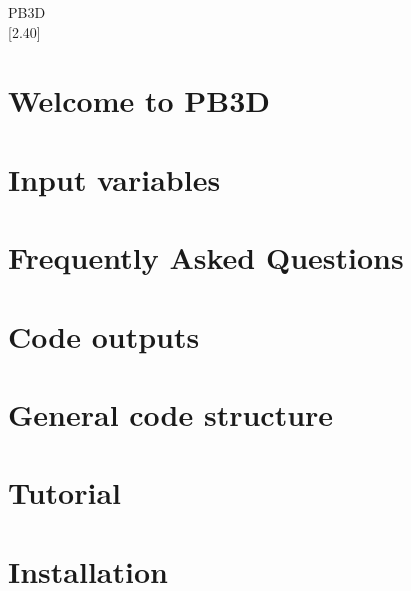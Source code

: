 \documentclass[twoside]{book}
\newcommand{\+}{\discretionary{\mbox{\scriptsize$\hookleftarrow$}}{}{}}
\newcommand{\clearemptydoublepage}{%
  \newpage{\pagestyle{empty}\cleardoublepage}%
}
\begin{document}
\hypersetup{pageanchor=false,
             bookmarksnumbered=true,
             pdfencoding=unicode
            }
\begin{titlepage}
\vspace*{7cm}
\begin{center}%
{\color{stylecolor} \TitleFont\fontsize{72}{80} \selectfont P\+B3D \\}
\vspace*{1cm}
{\large \mbox{[}2.\+40\mbox{]} }\\
\vspace*{1cm}
\end{center}
\end{titlepage}
\clearemptydoublepage
{}
\tableofcontents
\clearemptydoublepage
{}
\hypersetup{pageanchor=true}

\chapter{Welcome to P\+B3D}
\label{index}\hypertarget{index}{}
\chapter{Input variables}
\label{page_inputs}

\chapter{Frequently Asked Questions}
\label{page_faq}

\chapter{Code outputs}
\label{page_outputs}

\chapter{General code structure}
\label{page_overview}

\chapter{Tutorial}
\label{page_tutorial}

\chapter{Installation}
\label{page_installation}

\end{document}
